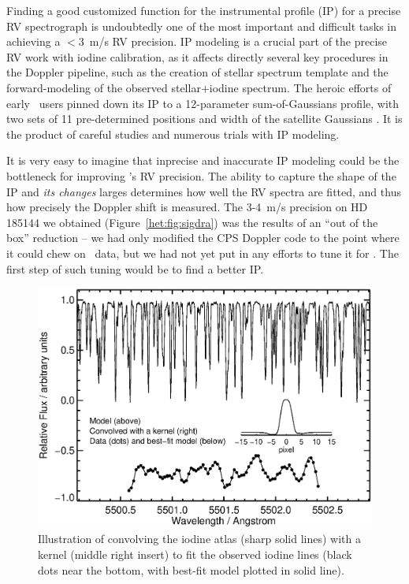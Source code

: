 
Finding a good customized function for the instrumental profile (IP)
for a precise RV spectrograph is undoubtedly one of the most important
and difficult tasks in achieving a $<3$~m/s RV precision. IP modeling
is a crucial part of the precise RV work with iodine calibration, as
it affects directly several key procedures in the Doppler pipeline,
such as the creation of stellar spectrum template and the
forward-modeling of the observed stellar$+$iodine spectrum. The heroic
efforts of early \keck\ users pinned down its IP to a 12-parameter
sum-of-Gaussians profile, with two sets of 11 pre-determined positions
and width of the satellite Gaussians \citep{1995PASP..107..966V}. It
is the product of careful studies and numerous trials with IP
modeling.

It is very easy to imagine that inprecise and inaccurate IP modeling
could be the bottleneck for improving \het's RV precision. The ability
to capture the shape of the IP and {\em its changes} larges determines
how well the RV spectra are fitted, and thus how precisely the Doppler
shift is measured. The 3-4~m/s precision on HD 185144 we obtained
(Figure~\ref{het:fig:sigdra}) was the results of an ``out of the box''
reduction -- we had only modified the CPS Doppler code to the point
where it could chew on \het\ data, but we had not yet put in any
efforts to tune it for \het. The first step of such tuning would be to
find a better IP.


\begin{figure}
\centering
\includegraphics[scale=0.45]{het/convolution_kernel.eps}
\caption{Illustration of convolving the iodine atlas (sharp solid
  lines) with a kernel (middle right insert) to fit the observed
  iodine lines (black dots near the bottom, with best-fit model
  plotted in solid line).
\label{het:fig:convkernel}}
\end{figure}


